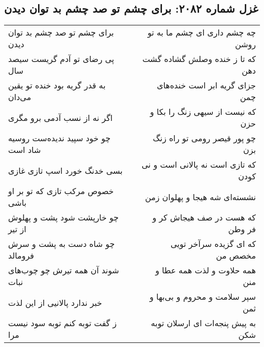 \begin{center}
\section*{غزل شماره ۲۰۸۲: برای چشم تو صد چشم بد توان دیدن}
\label{sec:2082}
\begin{longtable}{l p{0.5cm} r}
برای چشم تو صد چشم بد توان دیدن
&&
چه چشم داری ای چشم ما به تو روشن
\\
پی رضای تو آدم گریست سیصد سال
&&
که تا ز خنده وصلش گشاده گشت دهن
\\
به قدر گریه بود خنده تو یقین می‌دان
&&
جزای گریه ابر است خنده‌های چمن
\\
اگر نه از نسب آدمی برو مگری
&&
که نیست از سیهی زنگ را بکا و حزن
\\
چو خود سپید ندیده‌ست روسیه شاد است
&&
چو پور قیصر رومی تو راه زنگ بزن
\\
بسی خدنگ خورد اسپ تازی غازی
&&
که تازی است نه پالانی است و نی کودن
\\
خصوص مرکب تازی که تو بر او باشی
&&
نشسته‌ای شه هیجا و پهلوان زمن
\\
چو خارپشت شود پشت و پهلوش از تیر
&&
که هست در صف هیجاش کر و فر وطن
\\
چو شاه دست به پشت و سرش فرومالد
&&
که ای گزیده سرآخر تویی مخصص من
\\
شوند آن همه تیرش چو چوب‌های نبات
&&
همه حلاوت و لذت همه عطا و منن
\\
خبر ندارد پالانیی از این لذت
&&
سپر سلامت و محروم و بی‌بها و ثمن
\\
ز گفت توبه کنم توبه سود نیست مرا
&&
به پیش پنجه‌ات ای ارسلان توبه شکن
\\
\end{longtable}
\end{center}
